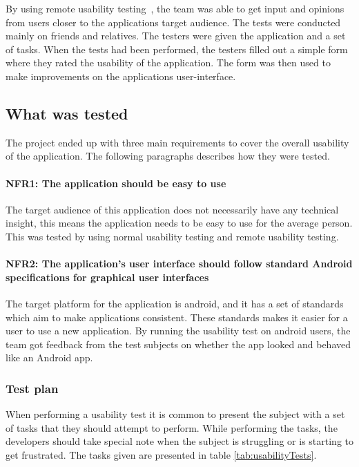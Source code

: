 
By using remote usability testing~\cite{remoteTest}, the team was able to get input and opinions from users closer to the applications target audience.
The tests were conducted mainly on friends and relatives. The testers were given the application and a set of tasks. When the tests had been performed, the testers filled out a simple form where they rated the usability of the application. The form was then used to make improvements on the applications user-interface.

\subsection{What was tested}
The project ended up with three main requirements to cover the overall usability of the application. The following paragraphs describes how they were tested.

\paragraph{NFR1: The application should be easy to use}
The target audience of this application does not necessarily have any technical insight, this means the application needs to be easy to use for the average person. This was tested by using normal usability testing and remote usability testing.

\paragraph{NFR2: The application's user interface should follow standard Android specifications for graphical user interfaces}
The target platform for the application is android, and it has a set of standards which aim to make applications consistent. These standards makes it easier for a user to use a new application.
By running the usability test on android users, the team got feedback from the test subjects on whether the app looked and behaved like an Android app.

\subsubsection{Test plan}
When performing a usability test it is common to present the subject with a set of tasks that they should attempt to perform. While performing the tasks, the developers should take special note when the subject is struggling or is starting to get frustrated. The tasks given are presented in table \ref{tab:usabilityTests}.

